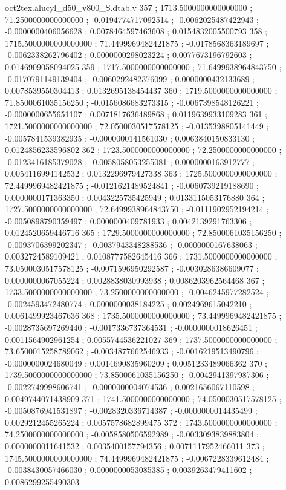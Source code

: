 \begin{filecontents}[overwrite]{oct2tex.alucyl_d50_v800_S.dtab.v}
357 ; 1713.5000000000000000 ; 71.2500000000000000 ; -0.0194774717092514 ; -0.0062025487422943 ; -0.0000000406056628 ; 0.0078464597463608 ; 0.0154832005500793
358 ; 1715.5000000000000000 ; 71.4499969482421875 ; -0.0178568363189697 ; -0.0062338262796402 ; 0.0000000298023224 ; 0.0077673196792603 ; 0.0146909058094025
359 ; 1717.5000000000000000 ; 71.6499938964843750 ; -0.0170791149139404 ; -0.0060292482376099 ; 0.0000000432133689 ; 0.0078539550304413 ; 0.0132695138454437
360 ; 1719.5000000000000000 ; 71.8500061035156250 ; -0.0156086683273315 ; -0.0067398548126221 ; -0.0000000655651107 ; 0.0071817636489868 ; 0.0119639933109283
361 ; 1721.5000000000000000 ; 72.0500030517578125 ; -0.0135398805141449 ; -0.0057841539382935 ; -0.0000000141561030 ; 0.0063840150833130 ; 0.0124856233596802
362 ; 1723.5000000000000000 ; 72.2500000000000000 ; -0.0123416185379028 ; -0.0058058053255081 ; 0.0000000163912777 ; 0.0054116994142532 ; 0.0132296979427338
363 ; 1725.5000000000000000 ; 72.4499969482421875 ; -0.0121621489524841 ; -0.0060739219188690 ; 0.0000000171363350 ; 0.0043225735425949 ; 0.0133115053176880
364 ; 1727.5000000000000000 ; 72.6499938964843750 ; -0.0111902952194214 ; -0.0050898790359497 ; 0.0000000409781933 ; 0.0042139291763306 ; 0.0124520659446716
365 ; 1729.5000000000000000 ; 72.8500061035156250 ; -0.0093706399202347 ; -0.0037943348288536 ; -0.0000000167638063 ; 0.0032724589109421 ; 0.0108777582645416
366 ; 1731.5000000000000000 ; 73.0500030517578125 ; -0.0071596950292587 ; -0.0030286386609077 ; 0.0000000067055224 ; 0.0028838030993938 ; 0.0086203962564468
367 ; 1733.5000000000000000 ; 73.2500000000000000 ; -0.0046245977282524 ; -0.0024593472480774 ; 0.0000000038184225 ; 0.0024969615042210 ; 0.0061499923467636
368 ; 1735.5000000000000000 ; 73.4499969482421875 ; -0.0028735697269440 ; -0.0017336737364531 ; -0.0000000018626451 ; 0.0011564902961254 ; 0.0055744536221027
369 ; 1737.5000000000000000 ; 73.6500015258789062 ; -0.0034877662546933 ; -0.0016219513490796 ; -0.0000000024680049 ; 0.0014690835960209 ; 0.0051233489066362
370 ; 1739.5000000000000000 ; 73.8500061035156250 ; -0.0042941397987306 ; -0.0022749998606741 ; -0.0000000004074536 ; 0.0021656067110598 ; 0.0049744071438909
371 ; 1741.5000000000000000 ; 74.0500030517578125 ; -0.0050876941531897 ; -0.0028320336714387 ; -0.0000000014435499 ; 0.0029212455265224 ; 0.0057578682899475
372 ; 1743.5000000000000000 ; 74.2500000000000000 ; -0.0058580506592989 ; -0.0033093839883804 ; 0.0000000011641532 ; 0.0035400157794356 ; 0.0071117952466011
373 ; 1745.5000000000000000 ; 74.4499969482421875 ; -0.0067228339612484 ; -0.0038430057466030 ; 0.0000000053085385 ; 0.0039263479411602 ; 0.0086299255490303

\end{filecontents}

